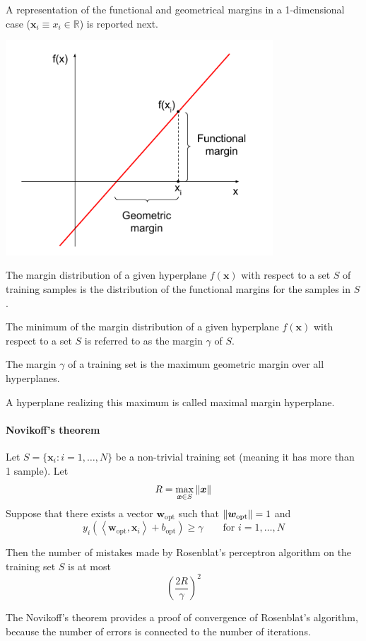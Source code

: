 \documentclass[oneside,onecolumn]{report}
\newcommand{\inp}[2]{\left\langle #1, #2 \right\rangle}
\begin{document}
A representation of the functional and geometrical margins in a 1-dimensional case ($\bm x_i \equiv x_i \in \mathbb R$) is reported next.
\begin{center}
    \includegraphics[width=10cm]{functional_and_geometrical_margin.png}
\end{center}

The margin distribution of a given hyperplane $f(\bm x)$ with respect to a set $S$ of training samples is the distribution of the functional margins for the samples in $S$.

The minimum of the margin distribution of a given hyperplane $f(\bm x)$ with respect to a set $S$ is referred to as the margin $\gamma$ of $S$.

The margin $\gamma$ of a training set is the maximum geometric margin over all hyperplanes.

A hyperplane realizing this maximum is called maximal margin hyperplane.

\paragraph{Novikoff's theorem}
Let $S = \{ \bm x_i: i = 1, \dots, N \}$ be a non-trivial training set (meaning it has more than 1 sample).
Let
$$ R = \max_{\bm x \in S} \norm{\bm x} $$
Suppose that there exists a vector $\bm w_\text{opt}$ such that $\norm{\bm w_\text{opt}} = 1$ and
$$ y_i \left( \inp{\bm w_\text{opt}}{\bm x_i} + b_\text{opt} \right) \geq \gamma \qquad \text{for } i = 1, \dots, N $$

Then the number of mistakes made by Rosenblat's perceptron algorithm on the training set $S$ is at most
$$ \left( \frac{2 R}{\gamma} \right)^2 $$

The Novikoff's theorem provides a proof of convergence of Rosenblat's algorithm, because the number of errors is connected to the number of iterations.
\end{document}
